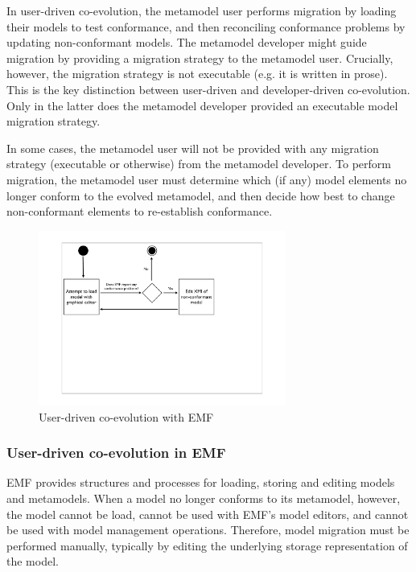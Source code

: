 In user-driven co-evolution, the metamodel user performs migration by loading their models to test conformance, and then reconciling conformance problems by updating non-conformant models. The metamodel developer might guide migration by providing a migration strategy to the metamodel user. Crucially, however, the migration strategy is not executable (e.g. it is written in prose). This is the key distinction between user-driven and developer-driven co-evolution. Only in the latter does the metamodel developer provided an executable model migration strategy.  

In some cases, the metamodel user will not be provided with any migration strategy (executable or otherwise) from the metamodel developer. To perform migration, the metamodel user must determine which (if any) model elements no longer conform to the evolved metamodel, and then decide how best to change non-conformant elements to re-establish conformance.

\begin{figure}[htbp]
	\centering
		\includegraphics*[viewport=80 280 600 550,height=5.75cm]{6.Evaluation/images/user_driven/emf_process.pdf}
	\caption{User-driven co-evolution with EMF}
	\label{fig:emf_process_analysis}
\end{figure}

\subsubsection{User-driven co-evolution in EMF}
EMF provides structures and processes for loading, storing and editing models and metamodels. When a model no longer conforms to its metamodel, however, the model cannot be load, cannot be used with EMF's model editors, and cannot be used with model management operations. Therefore, model migration must be performed manually, typically by editing the underlying storage representation of the model.

